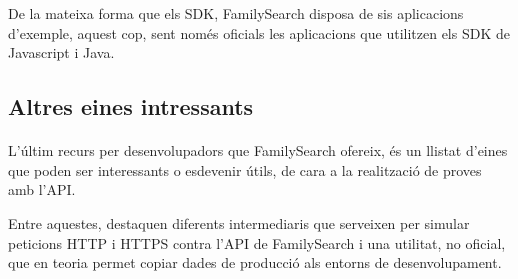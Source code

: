         De la mateixa forma que els SDK, FamilySearch disposa de sis aplicacions d'exemple, aquest cop, sent només oficials les aplicacions que utilitzen els SDK de Javascript i Java.


    \subsection{Altres eines intressants}

        \paragraph{}
        L'últim recurs per desenvolupadors que FamilySearch ofereix, és un llistat d'eines que poden ser interessants o esdevenir útils, de cara a la realització de proves amb l'API.

        Entre aquestes, destaquen diferents intermediaris que serveixen per simular peticions HTTP i HTTPS contra l'API de FamilySearch i una utilitat, no oficial, que en teoria permet copiar dades de producció als entorns de desenvolupament.
